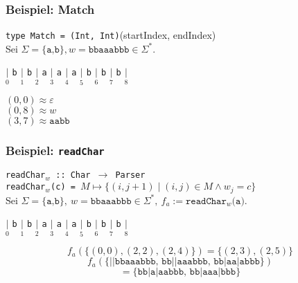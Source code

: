 \documentclass{beamer}
\begin{document}
    \begin{frame}
        \frametitle{\textbf{Beispiel:} Match}
        \texttt{type Match = (Int, Int)}\hfill(startIndex, endIndex)\\[5pt]
        Sei $\Sigma = \{\texttt{a,b}\}, w = \texttt{bbaaabbb} \in \Sigma^*$.\\[30pt]
        \begin{center}
            $\underset{0}{|}$
                {\Large\texttt{b}}
            $\underset{1}{|}$
                {\Large\texttt{b}}
            $\underset{2}{|}$
                {\Large\texttt{a}}
            $\underset{3}{|}$
                {\Large\texttt{a}}
            $\underset{4}{|}$
                {\Large\texttt{a}}
            $\underset{5}{|}$
                {\Large\texttt{b}}
            $\underset{6}{|}$
                {\Large\texttt{b}}
            $\underset{7}{|}$
                {\Large\texttt{b}}
            $\underset{8}{|}$\\[30pt]
        \end{center}
        \pause
        $(0,0) \approx \varepsilon$\\
        $(0,8) \approx w$\\
        $(3,7) \approx \texttt{aabb}$\\
    \end{frame}




    \begin{frame}[t]
        \frametitle{\textbf{Beispiel:} \texttt{readChar}}
        \texttt{readChar$_w$ :: Char $\to$ Parser}\\
        \texttt{readChar$_w$(c) = }$M \mapsto \{(i, j+1) \mid (i,j) \in M \land w_j = c\}$\\[10pt]
        Sei $\Sigma = \{\texttt{a,b}\},\ w = \texttt{bbaaabbb} \in \Sigma^*,\ f_a := \texttt{readChar$_w$(a)}$.\\
        \begin{center}
            $\underset{0}{|}$
                {\Large\texttt{b}}
            $\underset{1}{|}$
                {\Large\texttt{b}}
            $\underset{2}{|}$
                {\Large\texttt{a}}
            $\underset{3}{|}$
                {\Large\texttt{a}}
            $\underset{4}{|}$
                {\Large\texttt{a}}
            $\underset{5}{|}$
                {\Large\texttt{b}}
            $\underset{6}{|}$
                {\Large\texttt{b}}
            $\underset{7}{|}$
                {\Large\texttt{b}}
            $\underset{8}{|}$
        \end{center}
        \pause
        $$
            f_a(\{(0,0), (2,2), (2,4)\}) = \{(2,3), (2,5)\}
        $$
        \pause
        $$
            f_a(\{\texttt{||bbaaabbb, bb||aaabbb, bb|aa|abbb}\})
            $$$$
            = \{\texttt{bb|a|aabbb, bb|aaa|bbb}\}
        $$
    \end{frame}
\end{document}
